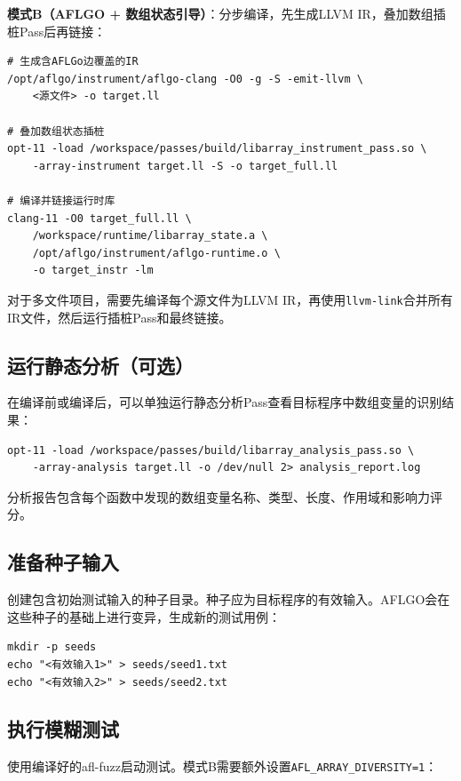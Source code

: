 \documentclass[bachelor]{njupthesis}
\begin{document}
\textbf{模式B（AFLGO + 数组状态引导）}：分步编译，先生成LLVM IR，叠加数组插桩Pass后再链接：

\begin{verbatim}
# 生成含AFLGo边覆盖的IR
/opt/aflgo/instrument/aflgo-clang -O0 -g -S -emit-llvm \
    <源文件> -o target.ll

# 叠加数组状态插桩
opt-11 -load /workspace/passes/build/libarray_instrument_pass.so \
    -array-instrument target.ll -S -o target_full.ll

# 编译并链接运行时库
clang-11 -O0 target_full.ll \
    /workspace/runtime/libarray_state.a \
    /opt/aflgo/instrument/aflgo-runtime.o \
    -o target_instr -lm
\end{verbatim}

对于多文件项目，需要先编译每个源文件为LLVM IR，再使用\texttt{llvm-link}合并所有IR文件，然后运行插桩Pass和最终链接。

\subsection{运行静态分析（可选）}

在编译前或编译后，可以单独运行静态分析Pass查看目标程序中数组变量的识别结果：

\begin{verbatim}
opt-11 -load /workspace/passes/build/libarray_analysis_pass.so \
    -array-analysis target.ll -o /dev/null 2> analysis_report.log
\end{verbatim}

分析报告包含每个函数中发现的数组变量名称、类型、长度、作用域和影响力评分。

\subsection{准备种子输入}

创建包含初始测试输入的种子目录。种子应为目标程序的有效输入。AFLGO会在这些种子的基础上进行变异，生成新的测试用例：

\begin{verbatim}
mkdir -p seeds
echo "<有效输入1>" > seeds/seed1.txt
echo "<有效输入2>" > seeds/seed2.txt
\end{verbatim}

\subsection{执行模糊测试}

使用编译好的afl-fuzz启动测试。模式B需要额外设置\texttt{AFL\_ARRAY\_DIVERSITY=1}：
\end{document}
